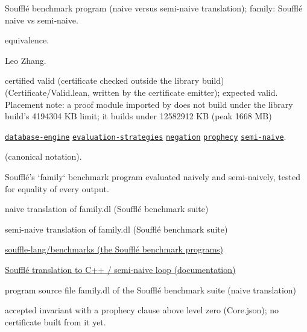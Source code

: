 \documentclass[10pt]{article}
\begin{document}
\begin{description}[leftmargin=2.6cm,style=nextline,itemsep=1pt]

\item[Category] Soufflé benchmark program (naive versus semi-naive translation); family: Soufflé naive vs semi-naive.

\item[Kind] equivalence.

\item[Contributors] Leo Zhang.

\item[Status] certified valid (certificate checked outside the library build) (Certificate/Valid.lean, written by the certificate emitter); expected valid. Placement note: a proof module imported by  does not build under the library build's 4194304 KB limit; it builds under 12582912 KB (peak 1668 MB)

\item[Tags] \hyperref[tag:database-engine]{\texttt{database-engine}} \hyperref[tag:evaluation-strategies]{\texttt{evaluation-strategies}} \hyperref[tag:negation]{\texttt{negation}} \hyperref[tag:prophecy]{\texttt{prophecy}} \hyperref[tag:semi-naive]{\texttt{semi-naive}}.

\item[Input]  (canonical notation).

\item[Summary] Soufflé's `family` benchmark program evaluated naively and semi-naively, tested for equality of every output.

\item[Sides] naive translation of family.dl (Soufflé benchmark suite) \par semi-naive translation of family.dl (Soufflé benchmark suite)

\item[Sources] {\raggedright \href{https://github.com/souffle-lang/benchmarks}{souffle-lang/benchmarks (the Soufflé benchmark programs)} \par \href{https://souffle-lang.github.io/translate}{Soufflé translation to C++ / semi-naive loop (documentation)} \par program source file family.dl of the Soufflé benchmark suite (naive translation)\par}

\item[Prophecy] accepted invariant with a prophecy clause above level zero (Core.json); no certificate built from it yet.

\end{description}
\end{document}
